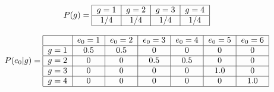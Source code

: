 \documentclass[a4paper,10pt]{article}
\begin{document}
\begin{align}
\centering
P(g) = \begin{tabular}{|c|c|c|c|}
        \hline
        $g=1$ & $g=2$ & $g=3$  & $g=4$\\ \hline
        $1/4$ & $1/4$ & $1/4$ & $1/4$ \\ \hline
\end{tabular}
\end{align}

\begin{align}
\centering
P(e_0|g) = \begin{tabular}{|c|c|c|c|c|c|c|}
        \hline
        & $e_0=1$ & $e_0=2$ & $e_0=3$ &  $e_0=4$ & $e_0=5$ & $e_0=6$ \\ \hline
       $g=1$ & $0.5$ & $0.5$ & $0$ &  $0$ & $0$ & $0$ \\ \hline
       $g=2$ & $0$ & $0$ & $0.5$ & $0.5$ & $0$ & $0$ \\ \hline
       $g=3$ & $0$ & $0$ & $0$ & $0$ & $1.0$ & $0$ \\ \hline
       $g=4$ & $0$ & $0$ & $0$ & $0$ & $0$ & $1.0$ \\ \hline
\end{tabular}
\end{align}





\begin{figure}[H]
\centering
{}
\caption{}
\label{fig:modelo_grafico}
\end{figure}
\end{document}
